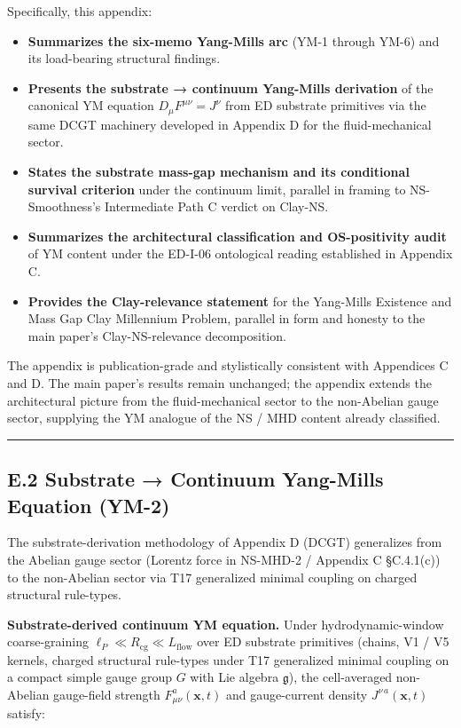 \documentclass[
  11pt,a4paper]{article}
\providecommand{\tightlist}{%
  \setlength{\itemsep}{0pt}\setlength{\parskip}{0pt}}
\begin{document}
Specifically, this appendix:

\begin{itemize}
\tightlist
\item
  \textbf{Summarizes the six-memo Yang-Mills arc} (YM-1 through YM-6)
  and its load-bearing structural findings.
\item
  \textbf{Presents the substrate → continuum Yang-Mills derivation} of
  the canonical YM equation \(D_\mu F^{\mu\nu} = J^\nu\) from ED
  substrate primitives via the same DCGT machinery developed in Appendix
  D for the fluid-mechanical sector.
\item
  \textbf{States the substrate mass-gap mechanism and its conditional
  survival criterion} under the continuum limit, parallel in framing to
  NS-Smoothness's Intermediate Path C verdict on Clay-NS.
\item
  \textbf{Summarizes the architectural classification and OS-positivity
  audit} of YM content under the ED-I-06 ontological reading established
  in Appendix C.
\item
  \textbf{Provides the Clay-relevance statement} for the Yang-Mills
  Existence and Mass Gap Clay Millennium Problem, parallel in form and
  honesty to the main paper's Clay-NS-relevance decomposition.
\end{itemize}

The appendix is publication-grade and stylistically consistent with
Appendices C and D. The main paper's results remain unchanged; the
appendix extends the architectural picture from the fluid-mechanical
sector to the non-Abelian gauge sector, supplying the YM analogue of the
NS / MHD content already classified.

\begin{center}\rule{0.5\linewidth}{0.5pt}\end{center}

\subsection{E.2 Substrate → Continuum Yang-Mills Equation
(YM-2)}\label{e.2-substrate-continuum-yang-mills-equation-ym-2}

The substrate-derivation methodology of Appendix D (DCGT) generalizes
from the Abelian gauge sector (Lorentz force in NS-MHD-2 / Appendix C
§C.4.1(c)) to the non-Abelian sector via T17 generalized minimal
coupling on charged structural rule-types.

\textbf{Substrate-derived continuum YM equation.} Under
hydrodynamic-window coarse-graining
\(\ell_P \ll R_\mathrm{cg} \ll L_\mathrm{flow}\) over ED substrate
primitives (chains, V1 / V5 kernels, charged structural rule-types under
T17 generalized minimal coupling on a compact simple gauge group \(G\)
with Lie algebra \(\mathfrak{g}\)), the cell-averaged non-Abelian
gauge-field strength \(F_{\mu\nu}^a(\mathbf{x},t)\) and gauge-current
density \(J^{\nu\,a}(\mathbf{x},t)\) satisfy:
\end{document}
